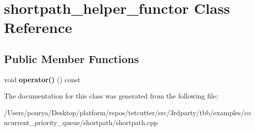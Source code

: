 \hypertarget{classshortpath__helper__functor}{}\section{shortpath\+\_\+helper\+\_\+functor Class Reference}
\label{classshortpath__helper__functor}
\subsection*{Public Member Functions}
\begin{DoxyCompactItemize}
\item 
\hypertarget{classshortpath__helper__functor_a6ec26960c61cdf6db3bee7baf7dd0ad0}{}void {\bfseries operator()} () const \label{classshortpath__helper__functor_a6ec26960c61cdf6db3bee7baf7dd0ad0}

\end{DoxyCompactItemize}


The documentation for this class was generated from the following file\+:\begin{DoxyCompactItemize}
\item 
/\+Users/pourya/\+Desktop/platform/repos/tetcutter/src/3rdparty/tbb/examples/concurrent\+\_\+priority\+\_\+queue/shortpath/shortpath.\+cpp\end{DoxyCompactItemize}
